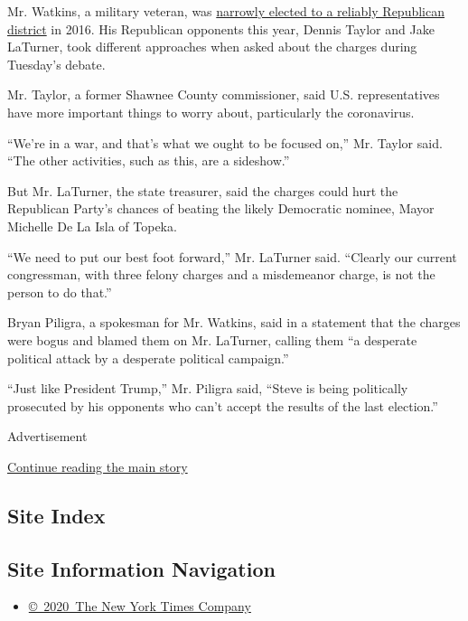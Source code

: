 Mr. Watkins, a military veteran, was
\href{https://www.nytimes3xbfgragh.onion/elections/results/kansas-house-district-2}{narrowly
elected to a reliably Republican district} in 2016. His Republican
opponents this year, Dennis Taylor and Jake LaTurner, took different
approaches when asked about the charges during Tuesday's debate.

Mr. Taylor, a former Shawnee County commissioner, said U.S.
representatives have more important things to worry about, particularly
the coronavirus.

``We're in a war, and that's what we ought to be focused on,'' Mr.
Taylor said. ``The other activities, such as this, are a sideshow.''

But Mr. LaTurner, the state treasurer, said the charges could hurt the
Republican Party's chances of beating the likely Democratic nominee,
Mayor Michelle De La Isla of Topeka.

``We need to put our best foot forward,'' Mr. LaTurner said. ``Clearly
our current congressman, with three felony charges and a misdemeanor
charge, is not the person to do that.''

Bryan Piligra, a spokesman for Mr. Watkins, said in a statement that the
charges were bogus and blamed them on Mr. LaTurner, calling them ``a
desperate political attack by a desperate political campaign.''

``Just like President Trump,'' Mr. Piligra said, ``Steve is being
politically prosecuted by his opponents who can't accept the results of
the last election.''

Advertisement

\protect\hyperlink{after-bottom}{Continue reading the main story}

\hypertarget{site-index}{%
\subsection{Site Index}\label{site-index}}

\hypertarget{site-information-navigation}{%
\subsection{Site Information
Navigation}\label{site-information-navigation}}

\begin{itemize}
\tightlist
\item
  \href{https://help.nytimes3xbfgragh.onion/hc/en-us/articles/115014792127-Copyright-notice}{©~2020~The
  New York Times Company}
\end{itemize}

